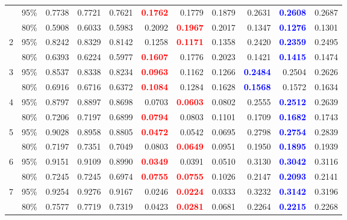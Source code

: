 \begin{longtable}[c]{ccrrrrrrrrr}
\endfoot
\bottomrule
\endlastfoot
1 & 95\% & 0.7738 & 0.7721 & 0.7621 & \textcolor{red}{\textbf{0.1762}} & 0.1779 & 0.1879 & 0.2631 & \textcolor{blue}{\textbf{0.2608}} & 0.2687 \\
 & 80\% & 0.5908 & 0.6033 & 0.5983 & 0.2092 & \textcolor{red}{\textbf{0.1967}} & 0.2017 & 0.1347 & \textcolor{blue}{\textbf{0.1276}} & 0.1301 \\
\cmidrule(lr){1-11}
2 & 95\% & 0.8242 & 0.8329 & 0.8142 & 0.1258 & \textcolor{red}{\textbf{0.1171}} & 0.1358 & 0.2420 & \textcolor{blue}{\textbf{0.2359}} & 0.2495 \\
 & 80\% & 0.6393 & 0.6224 & 0.5977 & \textcolor{red}{\textbf{0.1607}} & 0.1776 & 0.2023 & 0.1421 & \textcolor{blue}{\textbf{0.1415}} & 0.1474 \\
\cmidrule(lr){1-11}
3 & 95\% & 0.8537 & 0.8338 & 0.8234 & \textcolor{red}{\textbf{0.0963}} & 0.1162 & 0.1266 & \textcolor{blue}{\textbf{0.2484}} & 0.2504 & 0.2626 \\
 & 80\% & 0.6916 & 0.6716 & 0.6372 & \textcolor{red}{\textbf{0.1084}} & 0.1284 & 0.1628 & \textcolor{blue}{\textbf{0.1568}} & 0.1572 & 0.1634 \\
\cmidrule(lr){1-11}
4 & 95\% & 0.8797 & 0.8897 & 0.8698 & 0.0703 & \textcolor{red}{\textbf{0.0603}} & 0.0802 & 0.2555 & \textcolor{blue}{\textbf{0.2512}} & 0.2639 \\
 & 80\% & 0.7206 & 0.7197 & 0.6899 & \textcolor{red}{\textbf{0.0794}} & 0.0803 & 0.1101 & 0.1709 & \textcolor{blue}{\textbf{0.1682}} & 0.1743 \\
\cmidrule(lr){1-11}
5 & 95\% & 0.9028 & 0.8958 & 0.8805 & \textcolor{red}{\textbf{0.0472}} & 0.0542 & 0.0695 & 0.2798 & \textcolor{blue}{\textbf{0.2754}} & 0.2839 \\
 & 80\% & 0.7197 & 0.7351 & 0.7049 & 0.0803 & \textcolor{red}{\textbf{0.0649}} & 0.0951 & 0.1950 & \textcolor{blue}{\textbf{0.1895}} & 0.1939 \\
\cmidrule(lr){1-11}
6 & 95\% & 0.9151 & 0.9109 & 0.8990 & \textcolor{red}{\textbf{0.0349}} & 0.0391 & 0.0510 & 0.3130 & \textcolor{blue}{\textbf{0.3042}} & 0.3116 \\
 & 80\% & 0.7245 & 0.7245 & 0.6974 & \textcolor{red}{\textbf{0.0755}} & \textcolor{red}{\textbf{0.0755}} & 0.1026 & 0.2147 & \textcolor{blue}{\textbf{0.2093}} & 0.2141 \\
\cmidrule(lr){1-11}
7 & 95\% & 0.9254 & 0.9276 & 0.9167 & 0.0246 & \textcolor{red}{\textbf{0.0224}} & 0.0333 & 0.3232 & \textcolor{blue}{\textbf{0.3142}} & 0.3196 \\
 & 80\% & 0.7577 & 0.7719 & 0.7319 & 0.0423 & \textcolor{red}{\textbf{0.0281}} & 0.0681 & 0.2264 & \textcolor{blue}{\textbf{0.2215}} & 0.2268 \\

\end{longtable}
